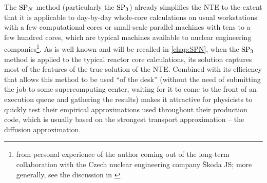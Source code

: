 The $\SPN$ method (particularly the $\SPN[3]$) already simplifies the NTE to the extent that it is applicable to
day-by-day whole-core calculations on usual workstations with a few computational cores or small-scale parallel machines
with tens to a few hundred cores, which are typical machines available to nuclear engineering
companies\footnote{\label{sjsexp}from personal experience of the author coming out of the long-term collaboration with
the Czech nuclear engineering company {\v S}koda JS; more generally, see the discussion in \cite[Sec.
2.4]{Sanchez7}}. As is well known and will be recalled in \ref{chap:SPN}, when the $\SPN[3]$ method is applied to the
typical reactor core calculations, its solution captures most of the features of the true solution of the NTE. Combined
with its efficiency that allows this method to be used ``of the desk'' (without the need of submitting the job to some
supercomputing center, waiting for it to come to the front of an execution queue and gathering the results) makes it
attractive for physicists to quickly test their empirical approximations used throughout their production code, which is
usually based on the strongest transport approximation -- the diffusion approximation.


